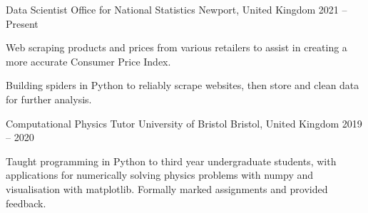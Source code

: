 
\begin{cventries}

    \cventry
        {Data Scientist} %
        {Office for National Statistics} %
        {Newport, United Kingdom} %
        {2021 -- Present} %
        {
            \begin{cvitems} %
                \item{Web scraping products and prices from various retailers to assist in creating a more accurate Consumer Price Index.}
                \item{Building spiders in Python to reliably scrape websites, then store and clean data for further analysis.}
            \end{cvitems}
        }

    \cventry
        {Computational Physics Tutor} %
        {University of Bristol} %
        {Bristol, United Kingdom} %
        {2019 -- 2020} %
        {
            \begin{cvitems} %
                \item{Taught programming in Python to third year undergraduate students, with applications for numerically solving physics problems with numpy and visualisation with matplotlib. Formally marked assignments and provided feedback.}
            \end{cvitems}
        }


\end{cventries}
